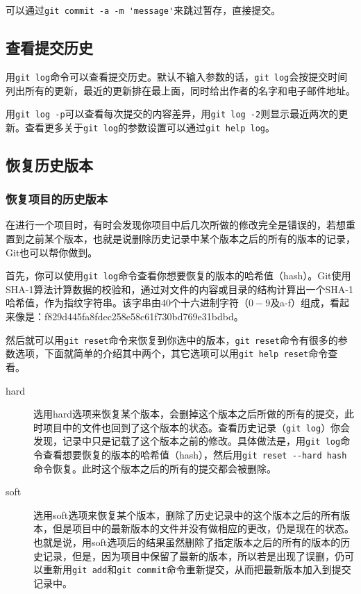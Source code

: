 \documentclass[a4paper,12pt]{article}
\begin{document}
可以通过\lstinline|git commit -a -m 'message'|来跳过暂存，直接提交。

\subsection{查看提交历史}

用\lstinline|git log|命令可以查看提交历史。默认不输入参数的话，\lstinline|git log|会按提交时间列出所有的更新，最近的更新排在最上面，同时给出作者的名字和电子邮件地址。

用\lstinline|git log -p|可以查看每次提交的内容差异，用\lstinline|git log -2|则显示最近两次的更新。查看更多关于\lstinline|git log|的参数设置可以通过\lstinline|git help log|。

\subsection{恢复历史版本}
\subsubsection{恢复项目的历史版本}

在进行一个项目时，有时会发现你项目中后几次所做的修改完全是错误的，若想重置到之前某个版本，也就是说删除历史记录中某个版本之后的所有的版本的记录，Git也可以帮你做到。

首先，你可以使用\lstinline|git log|命令查看你想要恢复的版本的哈希值（hash）。Git使用SHA-1算法计算数据的校验和，通过对文件的内容或目录的结构计算出一个SHA-1哈希值，作为指纹字符串。该字串由$40$个十六进制字符（$0-9$及a-f）组成，看起来像是：f829d445fa8fdec258e58c61f730bd769e31bdbd。

然后就可以用\lstinline|git reset|命令来恢复到你选中的版本，\lstinline|git reset|命令有很多的参数选项，下面就简单的介绍其中两个，其它选项可以用\lstinline|git help reset|命令查看。

\begin{description}
\item[hard] 选用hard选项来恢复某个版本，会删掉这个版本之后所做的所有的提交，此时项目中的文件也回到了这个版本的状态。查看历史记录（\lstinline|git log|）你会发现，记录中只是记载了这个版本之前的修改。具体做法是，用\lstinline|git log|命令查看想要恢复的版本的哈希值（hash），然后用\lstinline|git reset --hard hash|命令恢复。此时这个版本之后的所有的提交都会被删除。
\item[soft] 选用soft选项来恢复某个版本，删除了历史记录中的这个版本之后的所有版本，但是项目中的最新版本的文件并没有做相应的更改，仍是现在的状态。也就是说，用soft选项后的结果虽然删除了指定版本之后的所有的版本的历史记录，但是，因为项目中保留了最新的版本，所以若是出现了误删，仍可以重新用\lstinline|git add|和\lstinline|git commit|命令重新提交，从而把最新版本加入到提交记录中。
\end{description}
\end{document}
